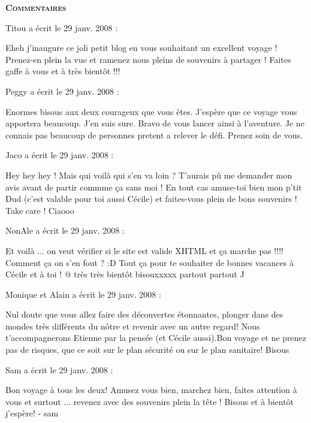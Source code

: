 \bigskip
\textbf{\textsc{Commentaires}}

\medskip
Titou a écrit le 29 janv. 2008 :
\begin{displayquote}
Eheh j'inaugure ce joli petit blog en vous souhaitant un excellent voyage ! Prenez-en plein la vue et ramenez nous pleins de souvenirs à partager ! Faites gaffe à vous et à très bientôt !!!
\end{displayquote}

\medskip
Peggy a écrit le 29 janv. 2008 :
\begin{displayquote}
Enormes bisous aux deux courageux que vous êtes. J'espère que ce voyage vous apportera beaucoup. J'en suis sure. Bravo de vous lancer ainsi à l'aventure. Je ne connais pas beaucoup de personnes pretent a relever le défi. Prenez soin de vous.
\end{displayquote}

\medskip
Jaco a écrit le 29 janv. 2008 :
\begin{displayquote}
Hey hey hey !
Mais qui voilà qui s'en va loin ? T'aurais pû me demander mon avis avant de partir commme ça sans moi !
En tout cas amuse-toi bien mon p'tit Dud (c'est valable pour toi aussi Cécile) et faites-vous plein de bons souvenirs !
Take care !
Ciaooo
\end{displayquote}

\medskip
NonAle a écrit le 29 janv. 2008 :
\begin{displayquote}
Et voilà ... on veut vérifier si le site est valide XHTML et ça marche pas !!!! Comment ça on s'en fout ? :D
Tout ça pour te souhaiter de bonnes vacances à Cécile et à toi ! 
@ très très bientôt 
bisouxxxxx partout partout ^^
\end{displayquote}

\medskip
Monique et Alain a écrit le 29 janv. 2008 :
\begin{displayquote}
Nul doute que vous allez faire des découvertes étonnantes, plonger dans des mondes très différents du nôtre et revenir avec un autre regard! Nous t'accompagnerons Etienne par la pensée (et Cécile aussi).Bon voyage et ne prenez pas de risques, que ce soit sur le plan sécurité ou sur le plan sanitaire!
Bisous
\end{displayquote}

\medskip
Sam a écrit le 29 janv. 2008 :
\begin{displayquote}
Bon voyage à tous les deux!
Amusez vous bien, marchez bien, faites attention à vous et surtout ... revenez avec des souvenirs plein la tête !
Bisous et à bientôt j'espère!
- sam
\end{displayquote}

